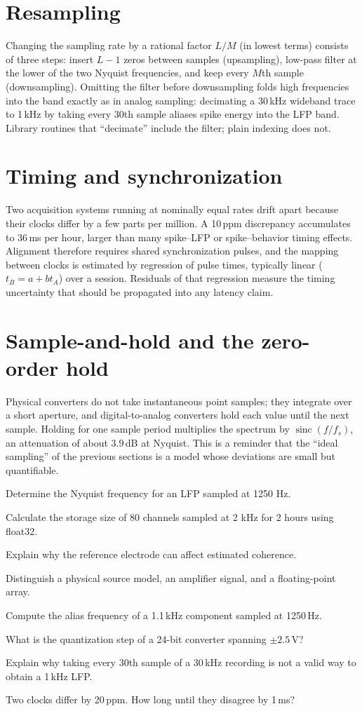 \section{Resampling}
Changing the sampling rate by a rational factor $L/M$ (in lowest terms) consists of three steps: insert $L-1$ zeros between samples (upsampling), low-pass filter at the lower of the two Nyquist frequencies, and keep every $M$th sample (downsampling). Omitting the filter before downsampling folds high frequencies into the band exactly as in analog sampling: decimating a 30\,kHz wideband trace to 1\,kHz by taking every 30th sample aliases spike energy into the LFP band. Library routines that ``decimate'' include the filter; plain indexing does not.

\section{Timing and synchronization}
Two acquisition systems running at nominally equal rates drift apart because their clocks differ by a few parts per million. A 10\,ppm discrepancy accumulates to $36$\,ms per hour, larger than many spike--LFP or spike--behavior timing effects. Alignment therefore requires shared synchronization pulses, and the mapping between clocks is estimated by regression of pulse times, typically linear ($t_B=a+bt_A$) over a session. Residuals of that regression measure the timing uncertainty that should be propagated into any latency claim.

\section{Sample-and-hold and the zero-order hold}
Physical converters do not take instantaneous point samples; they integrate over a short aperture, and digital-to-analog converters hold each value until the next sample. Holding for one sample period multiplies the spectrum by $\operatorname{sinc}(f/f_s)$, an attenuation of about $3.9$\,dB at Nyquist. This is a reminder that the ``ideal sampling'' of the previous sections is a model whose deviations are small but quantifiable.
\begin{exercises}
\item Determine the Nyquist frequency for an LFP sampled at 1250 Hz.
\item Calculate the storage size of 80 channels sampled at 2 kHz for 2 hours using float32.
\item Explain why the reference electrode can affect estimated coherence.
\item Distinguish a physical source model, an amplifier signal, and a floating-point array.
\item Compute the alias frequency of a 1.1\,kHz component sampled at 1250\,Hz.
\item What is the quantization step of a 24-bit converter spanning $\pm2.5$\,V?
\item Explain why taking every 30th sample of a 30\,kHz recording is not a valid way to obtain a 1\,kHz LFP.
\item Two clocks differ by 20\,ppm. How long until they disagree by 1\,ms?
\end{exercises}
